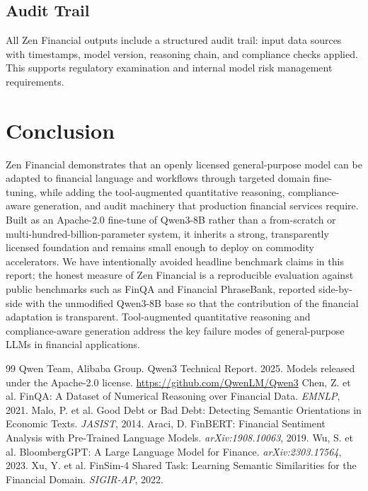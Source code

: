 \documentclass[11pt,a4paper]{article}
\begin{document}
\subsection{Audit Trail}

All Zen Financial outputs include a structured audit trail: input data sources with timestamps, model version, reasoning chain, and compliance checks applied. This supports regulatory examination and internal model risk management requirements.

\section{Conclusion}

Zen Financial demonstrates that an openly licensed general-purpose model can be adapted to financial language and workflows through targeted domain fine-tuning, while adding the tool-augmented quantitative reasoning, compliance-aware generation, and audit machinery that production financial services require. Built as an Apache-2.0 fine-tune of Qwen3-8B rather than a from-scratch or multi-hundred-billion-parameter system, it inherits a strong, transparently licensed foundation and remains small enough to deploy on commodity accelerators. We have intentionally avoided headline benchmark claims in this report; the honest measure of Zen Financial is a reproducible evaluation against public benchmarks such as FinQA and Financial PhraseBank, reported side-by-side with the unmodified Qwen3-8B base so that the contribution of the financial adaptation is transparent. Tool-augmented quantitative reasoning and compliance-aware generation address the key failure modes of general-purpose LLMs in financial applications.

\begin{thebibliography}{99}
 Qwen Team, Alibaba Group. Qwen3 Technical Report. 2025. Models released under the Apache-2.0 license. \url{https://github.com/QwenLM/Qwen3}
 Chen, Z. et al. FinQA: A Dataset of Numerical Reasoning over Financial Data. \textit{EMNLP}, 2021.
 Malo, P. et al. Good Debt or Bad Debt: Detecting Semantic Orientations in Economic Texts. \textit{JASIST}, 2014.
 Araci, D. FinBERT: Financial Sentiment Analysis with Pre-Trained Language Models. \textit{arXiv:1908.10063}, 2019.
 Wu, S. et al. BloombergGPT: A Large Language Model for Finance. \textit{arXiv:2303.17564}, 2023.
 Xu, Y. et al. FinSim-4 Shared Task: Learning Semantic Similarities for the Financial Domain. \textit{SIGIR-AP}, 2022.
\end{thebibliography}
\end{document}
